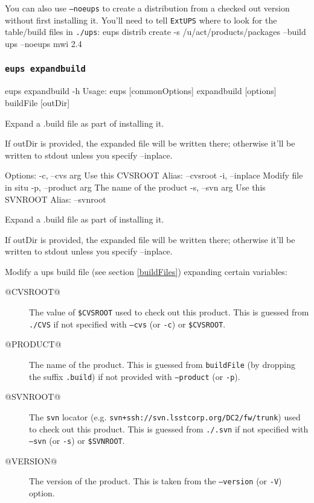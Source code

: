 \documentclass{article}
\newcommand{\code}[1]{\texttt{#1}}
\newcommand{\eups}{\code{ExtUPS}}
\let\overbatim=\verbatim
\let\oendverbatim=\endverbatim
\renewenvironment{verbatim}
{\center\minipage{16cm}\overbatim}
{\oendverbatim\endminipage\endcenter}
\begin{document}
You can also use \code{--noeups} to create a distribution from a checked out version without
first installing it.  You'll need to tell \eups{} where to look for the table/build files
in \code{./ups}:
\begin{verbatim}
eups distrib create -s /u/act/products/packages --build ups --noeups mwi 2.4
\end{verbatim}


\subsubsection{\code{eups expandbuild}}
\begin{verbatim}
eups expandbuild -h
Usage:
    eups [commonOptions] expandbuild [options] buildFile [outDir]

    Expand a .build file as part of installing it.

    If outDir is provided, the expanded file will be written there;
    otherwise it'll be written to stdout unless you specify --inplace.

Options:
   -c, --cvs        arg    Use this CVSROOT
                           Alias: --cvsroot
   -i, --inplace           Modify file in situ
   -p, --product    arg    The name of the product
   -s, --svn        arg    Use this SVNROOT
                           Alias: --svnroot

Expand a .build file as part of installing it.

If outDir is provided, the expanded file will be written there;
otherwise it'll be written to stdout unless you specify --inplace.
\end{verbatim}

Modify a ups build file (see section \ref{buildFiles}) expanding certain variables:
\begin{description}
  \item[\small @CVSROOT@] The value of \code{\$CVSROOT} used to check out this product.
    This is guessed from \code{./CVS} if not specified with \code{--cvs} (or \code{-c})
    or \code{\$CVSROOT}.
  \item[\small @PRODUCT@] The name of the product. This is guessed from \code{buildFile}
    (by dropping the suffix \code{.build}) if not provided with \code{--product} (or \code{-p}).
  \item[\small @SVNROOT@] The \code{svn} locator (e.g. \code{svn+ssh://svn.lsstcorp.org/DC2/fw/trunk})
    used to check out this product.
    This is guessed from \code{./.svn} if not specified with \code{--svn} (or \code{-s})
    or \code{\$SVNROOT}.
  \item[\small @VERSION@] The version of the product.  This is taken from the \code{--version} (or
    \code{-V}) option.
\end{description}
\end{document}
